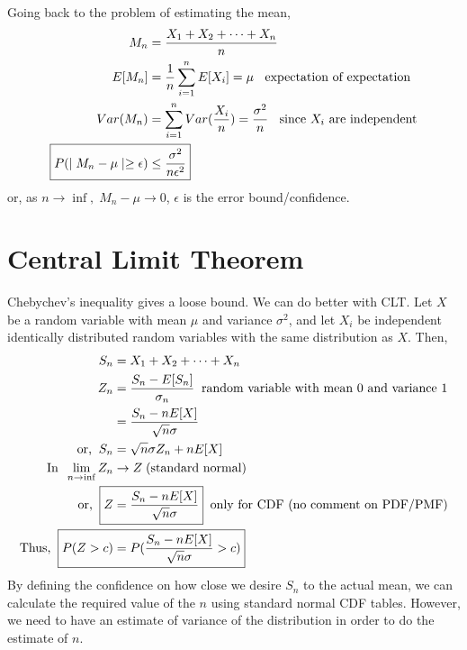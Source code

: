 \documentclass[../probability-notes.tex]{subfiles}
\begin{document}
    Going back to the problem of estimating the mean,
    \begin{align*}
        M_{n} &= \frac{X_{1} + X_{2} + \cdots + X_{n}}{n} \\
        E[M_{n}] &= \frac{1}{n} \sum_{i=1}^{n} E[X_{i}] = \mu \text{\;\; expectation of expectation} \\
        Var(M_{n}) &= \sum_{i=1}^{n} Var(\frac{X_{i}}{n}) = \frac{\sigma^{2}}{n} \text{\;\; since $X_{i}$ are independent} \\
        \Aboxed{P(\mid M_{n} - \mu \mid \geq \epsilon) &\leq \frac{\sigma^{2}}{n\epsilon^{2}}}
    \end{align*}
    or, as $n \rightarrow \inf,\; M_{n} - \mu \rightarrow 0$, $\epsilon$ is the error bound/confidence.

    \section{Central Limit Theorem}
    Chebychev's inequality gives a loose bound. We can do better with CLT. Let $X$ be a random variable with mean $\mu$ and variance $\sigma^{2}$, and let $X_{i}$ be independent identically distributed random variables with the same distribution as $X$. Then,
    \begin{align*}
        S_{n} &= X_{1} + X_{2} + \cdots + X_{n}\\
        Z_{n} &= \frac{S_{n} - E[S_{n}]}{\sigma_{n}} \text{\;\;random variable with mean $0$ and variance $1$} \\
             &= \frac{S_{n} - nE[X]}{\sqrt{n} \sigma}\\
        \text{or,\;\;} S_{n} &= \sqrt{n} \sigma Z_{n} + nE[X] \\
        \text{In\;\;} \lim_{n \to \inf} Z_{n} &\rightarrow Z \text{\;(standard normal)}\\
        \text{or,\;\;} \Aboxed{Z &= \frac{S_{n} - nE[X]}{\sqrt{n} \sigma}} \text{\;\;only for CDF (no comment on PDF/PMF)}\\
        \text{Thus,\;\;} \Aboxed{P(Z > c) &= P(\frac{S_{n} - nE[X]}{\sqrt{n} \sigma} > c)}
    \end{align*}
    By defining the confidence on how close we desire $S_{n}$ to the actual mean, we can calculate the required value of the $n$ using standard normal CDF tables. However, we need to have an estimate of variance of the distribution in order to do the estimate of $n$.
\end{document}
